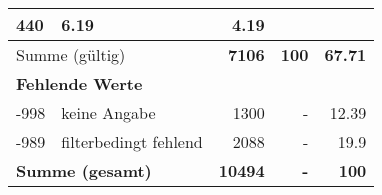 \begin{longtable}{lXrrr}
       \num{440} &
       \num[round-mode=places,round-precision=2]{6,19} &
         \num[round-mode=places,round-precision=2]{4,19} \\
     \midrule
     \multicolumn{2}{l}{Summe (gültig)} &
       \textbf{\num{7106}} &
     \textbf{100} &
       \textbf{\num[round-mode=places,round-precision=2]{67,71}} \\
     \multicolumn{5}{l}{\textbf{Fehlende Werte}}\\
       -998 &
       keine Angabe &
         \num{1300} &
        - &
         \num[round-mode=places,round-precision=2]{12,39} \\
       -989 &
       filterbedingt fehlend &
         \num{2088} &
        - &
         \num[round-mode=places,round-precision=2]{19,9} \\
     \midrule
     \multicolumn{2}{l}{\textbf{Summe (gesamt)}} &
          \textbf{\num{10494}} &
        \textbf{-} &
        \textbf{100} \\
     \bottomrule
     \end{longtable}
     

